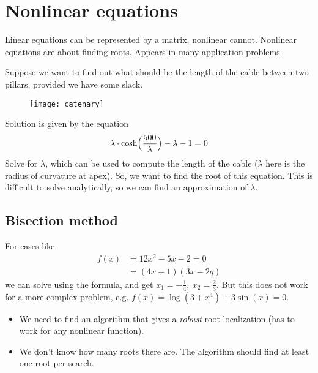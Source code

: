 \pagebreak
\section{Nonlinear equations}
Linear equations can be represented by a matrix, nonlinear cannot.
Nonlinear equations are about finding roots. Appears in many application problems.

\begin{example}
    Suppose we want to find out what should be the length
    of the cable between two pillars, provided we have some slack.
    \begin{figure*}[h]
        \centering
        \texttt{[image: catenary]}
    \end{figure*}

    Solution is given by the equation
    \[
        \lambda \cdot \cosh\Bigl(\frac{500}{\lambda}\Bigr) - \lambda - 1 = 0
    \]
    Solve for $\lambda$, which can be used to compute the length of the cable
    ($\lambda$ here is the radius of curvature at apex).
    So, we want to find the root of this equation.
    This is difficult to solve analytically, so we can find 
    an approximation of $\lambda$.
\end{example}

\subsection{Bisection method}
For cases like
\begin{align*}
    f(x) &= 12 x^2 - 5x - 2 = 0\\
    &=(4x + 1)(3x - 2q)
\end{align*}
we can solve using the formula, and get $x_1 = -\frac{1}{4},\ x_2 = \frac{2}{3}$.
But this does not work for a more complex problem, e.g.
$f(x) = \log(3 + x^4) + 3\sin(x) = 0$.

\begin{itemize}
    \item {
        We need to find an algorithm that gives a \textit{robust}
        root localization (has to work for any nonlinear function).
    }
    \item {
        We don't know how many roots there are. The algorithm should find at least one root per search.
    }
\end{itemize}
